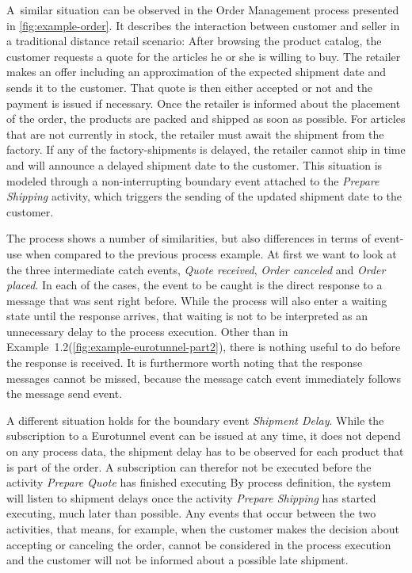 A~similar situation can be observed in the Order Management process presented in \autoref{fig:example-order}.
It describes the interaction between customer and seller in a traditional distance retail scenario: After browsing the product catalog, the customer requests a quote for the articles he or she is willing to buy.
The retailer makes an offer including an approximation of the expected shipment date and sends it to the customer. That quote is then either accepted or not and the payment is issued if necessary.
Once the retailer is informed about the placement of the order, the products are packed and shipped as soon as possible.
For articles that are not currently in stock, the retailer must await the shipment from the factory. If any of the factory-shipments is delayed, the retailer cannot ship in time and will announce a delayed shipment date to the customer.
This situation is modeled through a non-interrupting boundary event attached to the \textit{Prepare Shipping} activity, which triggers the sending of the updated shipment date to the customer.

The process shows a number of similarities, but also differences in terms of event-use when compared to the previous process example.
At first we want to look at the three intermediate catch events, \textit{Quote received}, \textit{Order canceled} and \textit{Order placed}.
In each of the cases, the event to be caught is the direct response to a message that was sent right before. While the process will also enter a waiting state until the response arrives, that waiting is not to be interpreted as an unnecessary delay to the process execution.
Other than in Example~1.2(\autoref{fig:example-eurotunnel-part2}), there is nothing useful to do before the response is received.
It is furthermore worth noting that the response messages cannot be missed, because the message catch event immediately follows the message send event.

A different situation holds for the boundary event \textit{Shipment Delay}.
While the subscription to a Eurotunnel event can be issued at any time, it does not depend on any process data, the shipment delay has to be observed for each product that is part of the order. A subscription can therefor not be executed before the activity \textit{Prepare Quote} has finished executing  
By process definition, the system will listen to shipment delays once the activity \textit{Prepare Shipping} has started executing, much later than possible.
Any events that occur between the two activities, that means, for example, when the customer makes the decision about accepting or canceling the order, cannot be considered in the process execution and the customer will not be informed about a possible late shipment.


